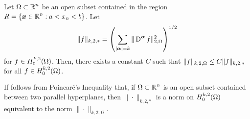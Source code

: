 \begin{theorem} \label{sob_pt_carre}
Let $\displaystyle \Omega \subset \mathbb{R}^n$ be an open subset contained
in the region $\displaystyle R= \{ {\bm{x}} \in \mathbb{R}^n : a < x_n < b \}$.  Let
\begin{equation} \label{sob_pc_norm}
\|f \|_{k,2,\ast} = \left( \sum_{|{\bm{\alpha}}|=k}
\| \operatorname{D}^{{\bm{\alpha}}} f \|_{2,\Omega}^2 \right)^{1/2}
\end{equation}
for $\displaystyle f \in H^{k,2}_0(\Omega)$.
Then, there exists a constant $C$ such that
$\displaystyle \|f\|_{k,2,\Omega} \leq C \| f \|_{k,2,\ast}$ for
all $\displaystyle f \in H^{k,2}_0(\Omega)$.
\end{theorem}

\begin{rmk}
If follows from Poincaré's Inequality that, if
$\displaystyle \Omega \subset \mathbb{R}^n$ is an open subset contained between two
parallel hyperplanes, then $\|\cdot\|_{k,2,\ast}$ is a norm on
$\displaystyle H^{k,2}_0(\Omega)$ equivalent to the norm
$\|\cdot\|_{k,2,\Omega}$.  \label{ell_equivNorms}
\end{rmk}

